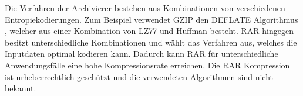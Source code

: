 Die Verfahren der Archivierer bestehen aus Kombinationen von verschiedenen Entropiekodierungen. Zum Beispiel verwendet GZIP den DEFLATE Algorithmus \cite{deutsch1996deflate}, welcher aus einer Kombination von LZ77 \cite{ziv1977universal} und Huffman \cite{huffman1952method} besteht. RAR hingegen besitzt unterschiedliche Kombinationen und wählt das Verfahren aus, welches die Inputdaten optimal kodieren kann. Dadurch kann RAR für unterschiedliche Anwendungsfälle eine hohe Kompressionsrate erreichen. Die RAR Kompression ist urheberrechtlich geschützt und die verwendeten Algorithmen sind nicht bekannt.